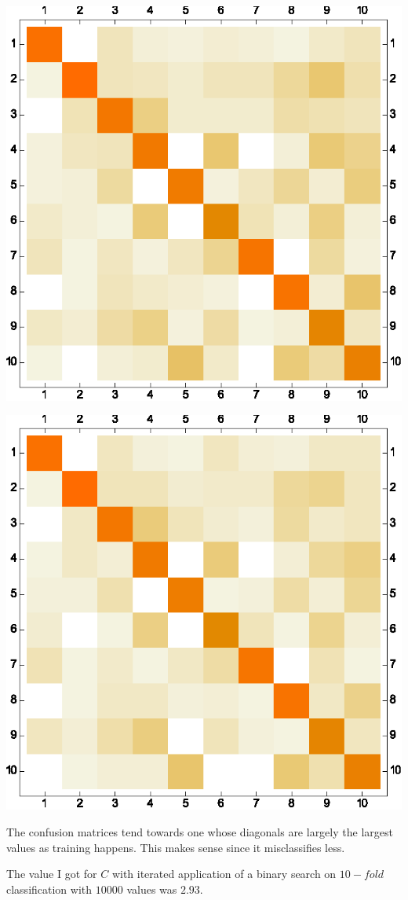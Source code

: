\documentclass[letter]{article}
\begin{document}
\includegraphics{GRAPHS_gr7.eps}

\includegraphics{GRAPHS_gr8.eps}

The confusion matrices tend towards one whose diagonals are
largely the largest values as training happens. This makes sense since it misclassifies less.

The value I got for $C$ with iterated application of a binary search on $10-fold$ classification with $10000$ values was $2.93.$
\end{document}
